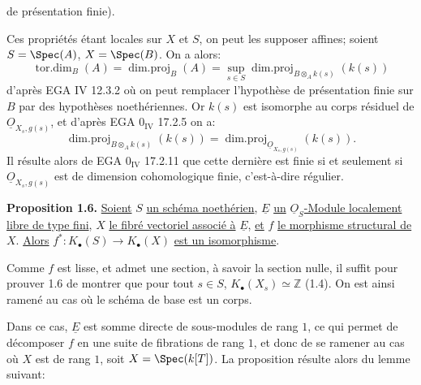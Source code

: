 
de présentation finie).

Ces propriétés étant locales sur $X$ et $S$, on peut les supposer affines; soient $S=\Spec(A)$, $X=\Spec(B)$. On a alors:
\[
\operatorname{tor.dim}_B(A)=\operatorname{dim.proj}_B(A)=\sup_{s\in S}\operatorname{dim.proj}_{B\otimes_A k(s)}(k(s))
\]
d'après EGA IV 12.3.2 où on peut remplacer l'hypothèse de présentation finie sur $B$ par des hypothèses noethériennes. Or $k(s)$ est isomorphe au corps résiduel de $\underline{O}_{X_s,g(s)}$, et d'après EGA $0_{\mathrm{IV}}$ 17.2.5 on a:
\[
\operatorname{dim.proj}_{B\otimes_A k(s)}(k(s))=
\operatorname{dim.proj}_{\underline{O}_{X_s,g(s)}}(k(s)).
\]
Il résulte alors de EGA $0_{\mathrm{IV}}$ 17.2.11 que cette dernière est finie si et seulement si $\underline{O}_{X_s,g(s)}$ est de dimension cohomologique finie, c'est-à-dire régulier.

\textbf{Proposition 1.6.} \uline{Soient} $S$ \uline{un schéma noethérien}, $\underline{E}$ \uline{un} $\underline{O}_S$\uline{-Module localement libre de type fini}, $X$ \uline{le fibré vectoriel associé à} $\underline{E}$, \uline{et} $f$ \uline{le morphisme structural de} $X$. \uline{Alors} \(f^*:K_\bullet(S)\longrightarrow K_\bullet(X)\) \uline{est un isomorphisme}.

Comme $f$ est lisse, et admet une section, à savoir la section nulle, il suffit pour prouver 1.6 de montrer que pour tout $s\in S$, $K_\bullet(X_s)\simeq \mathbb Z$ (1.4). On est ainsi ramené au cas où le schéma de base est un corps.

Dans ce cas, $\underline{E}$ est somme directe de sous-modules de rang $1$, ce qui permet de décomposer $f$ en une suite de fibrations de rang $1$, et donc de se ramener au cas où $X$ est de rang $1$, soit $X=\Spec(k[T])$. La proposition résulte alors du lemme suivant:

